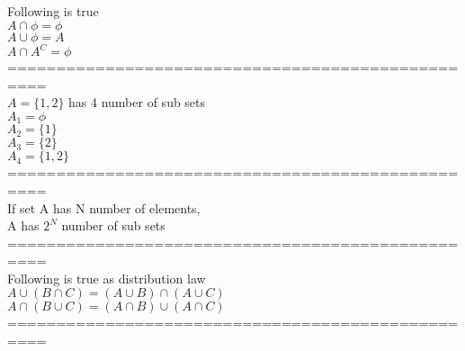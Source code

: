 \documentclass{article}
\begin{document}
Following is true \\ 
$A\cap \phi=\phi$ \\ 
$A\cup \phi=A$ \\ 
$A\cap A^C=\phi$ \\ 

================================================== \\
$A=\{1,2\}$ has 4 number of sub sets \\ 

$A_1=\phi$ \\
$A_2=\{1\}$ \\
$A_3=\{2\}$ \\
$A_4=\{1,2\}$ \\

================================================== \\
If set A has N number of elements, \\ 
A has $2^N$ number of sub sets \\ 

================================================== \\
Following is true as distribution law \\ 
$A\cup(B\cap C)=(A\cup B)\cap(A\cup C)$ \\ 
$A\cap(B\cup C)=(A\cap B)\cup(A\cap C)$ \\ 

================================================== \\
\end{document}
